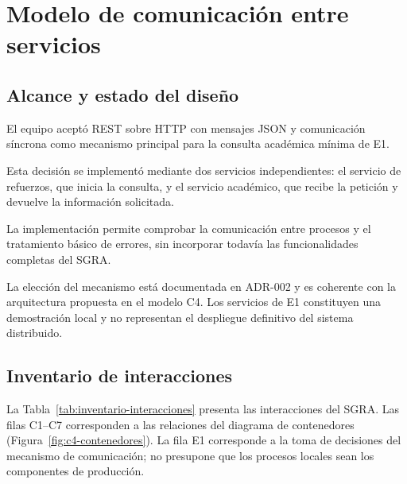 \section{Modelo de comunicación entre servicios}

\subsection{Alcance y estado del diseño}

El equipo aceptó REST sobre HTTP con mensajes JSON y comunicación síncrona como mecanismo principal para la consulta académica mínima de E1.

Esta decisión se implementó mediante dos servicios independientes: el servicio de refuerzos, que inicia la consulta, y el servicio académico, que recibe la petición y devuelve la información solicitada.

La implementación permite comprobar la comunicación entre procesos y el tratamiento básico de errores, sin incorporar todavía las funcionalidades completas del SGRA.

La elección del mecanismo está documentada en ADR-002 y es coherente con la arquitectura propuesta en el modelo C4. Los servicios de E1 constituyen una demostración local y no representan el despliegue definitivo del sistema distribuido.


\subsection{Inventario de interacciones}
La Tabla~\ref{tab:inventario-interacciones} presenta las interacciones del SGRA. Las filas C1--C7 corresponden a las relaciones del diagrama de contenedores (Figura~\ref{fig:c4-contenedores}). La fila E1 corresponde a la toma de decisiones del mecanismo de comunicación; no presupone que los procesos locales sean los componentes de producción.

